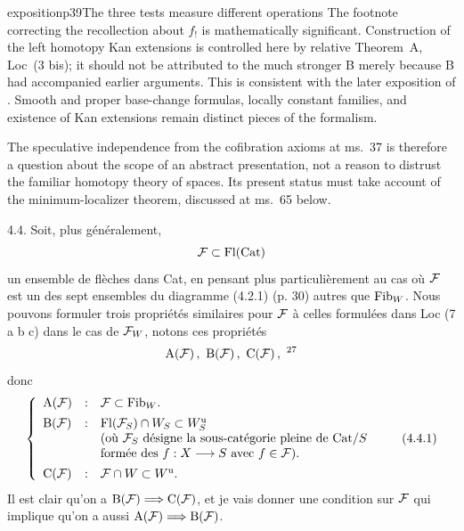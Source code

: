\begin{dcomment}{exposition}{p39}{The three tests measure different operations}
The footnote correcting the recollection about $f_!$ is mathematically significant. Construction of the left homotopy Kan extensions is controlled here by relative Theorem~A, Loc~(3 bis); it should not be attributed to the much stronger B merely because B had accompanied earlier arguments. This is consistent with the later exposition of \citet[pp.~3--4]{Maltsiniotis2005Asphericite}. Smooth and proper base-change formulas, locally constant families, and existence of Kan extensions remain distinct pieces of the formalism.

The speculative independence from the cofibration axioms at ms.~37 is therefore a question about the scope of an abstract presentation, not a reason to distrust the familiar homotopy theory of spaces. Its present status must take account of the minimum-localizer theorem, discussed at ms.~65 below.
\end{dcomment}


4.4. Soit, plus généralement,
\[
\mathcal{F} \subset \operatorname{Fl}(\mathrm{Cat})
\]
un ensemble de flèches dans Cat, en pensant plus particulièrement au cas où $\mathcal{F}$ est un des sept ensembles du diagramme (4.2.1) (p. 30) autres que $\mathrm{Fib}_W$. Nous pouvons formuler trois propriétés similaires pour $\mathcal{F}$ à celles formulées dans Loc (7 a b c) dans le cas de $\mathcal{F}_W$, notons ces propriétés
\[
\mathrm{A}(\cF)\,,\ \mathrm{B}(\cF)\,,\ \mathrm{C}(\cF)\,,\ \text{\footnotemark[27]}
\]
donc
\[
\left\{
\begin{array}{lcl}
\mathrm{A}(\cF) & : & \cF \subset \Fib_W. \\[1ex]
\mathrm{B}(\cF) & : & \Fl(\cF_S) \cap W_S \subset W_S^{\mathrm{u}} \\
 & & \text{(où $\cF_S$ désigne la sous-catégorie pleine de $\Cat/S$} \\
 & & \text{formée des $f : X \longrightarrow S$ avec $f \in \cF$).} \\[1ex]
\mathrm{C}(\cF) & : & \cF \cap W \subset W^{\mathrm{u}}.
\end{array}
\right.
\tag*{(4.4.1)}
\]
Il est clair qu'on a $\mathrm{B}(\mathcal{F}) \Longrightarrow \mathrm{C}(\mathcal{F})$, et je vais donner une condition sur $\mathcal{F}$ qui implique qu'on a aussi $\mathrm{A}(\mathcal{F}) \Longrightarrow \mathrm{B}(\mathcal{F})$.


